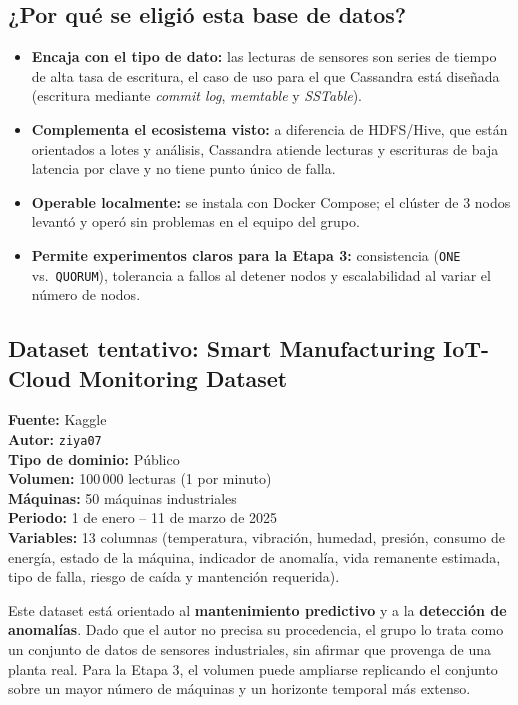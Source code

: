 \documentclass[12pt]{article}
\begin{document}
\subsection{¿Por qué se eligió esta base de datos?}
\begin{itemize}\itemsep0pt
  \item \textbf{Encaja con el tipo de dato:} las lecturas de sensores son series de tiempo de alta tasa de
        escritura, el caso de uso para el que Cassandra está diseñada (escritura mediante \textit{commit log},
        \textit{memtable} y \textit{SSTable}).
  \item \textbf{Complementa el ecosistema visto:} a diferencia de HDFS/Hive, que están orientados a lotes y
        análisis, Cassandra atiende lecturas y escrituras de baja latencia por clave y no tiene punto único de falla.
  \item \textbf{Operable localmente:} se instala con Docker Compose; el clúster de 3 nodos levantó y operó
        sin problemas en el equipo del grupo.
  \item \textbf{Permite experimentos claros para la Etapa 3:} consistencia (\texttt{ONE} vs.\ \texttt{QUORUM}),
        tolerancia a fallos al detener nodos y escalabilidad al variar el número de nodos.
\end{itemize}

\subsection{Dataset tentativo: Smart Manufacturing IoT-Cloud Monitoring Dataset}
\noindent
\textbf{Fuente:} Kaggle \\
\textbf{Autor:} \texttt{ziya07} \\
\textbf{Tipo de dominio:} Público \\
\textbf{Volumen:} 100\,000 lecturas (1 por minuto) \\
\textbf{Máquinas:} 50 máquinas industriales \\
\textbf{Periodo:} 1 de enero -- 11 de marzo de 2025 \\
\textbf{Variables:} 13 columnas (temperatura, vibración, humedad, presión, consumo de energía, estado de la máquina, indicador de anomalía, vida remanente estimada, tipo de falla, riesgo de caída y mantención requerida).

\vspace{0.6em}
Este dataset está orientado al \textbf{mantenimiento predictivo} y a la \textbf{detección de anomalías}. 
Dado que el autor no precisa su procedencia, el grupo lo trata como un conjunto de datos de sensores 
industriales, sin afirmar que provenga de una planta real. Para la Etapa 3, el volumen puede ampliarse 
replicando el conjunto sobre un mayor número de máquinas y un horizonte temporal más extenso.
\end{document}
